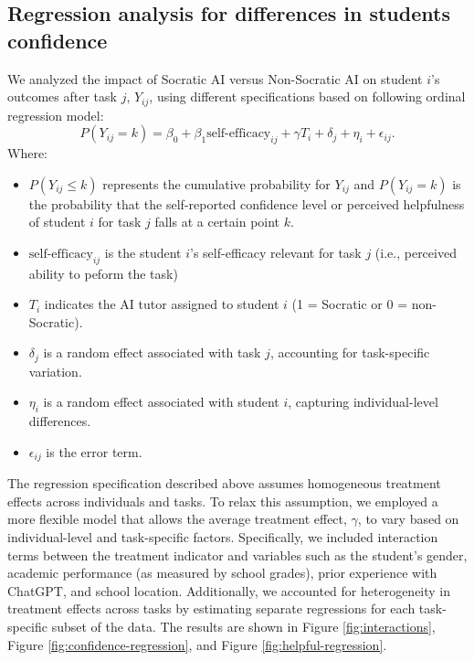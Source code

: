 \documentclass[
  12pt,
]{article}
\begin{document}
\subsection{Regression analysis for differences in students confidence}\label{sec:regress-confidence}

We analyzed the impact of Socratic AI versus Non-Socratic AI on student \(i\)'s outcomes after task \(j\), \(Y_{ij}\), using different specifications based on following ordinal regression model:
\[
  P(Y_{ij} = k) = 
    \beta_0 + \beta_1 \text{self-efficacy}_{ij} + \gamma T_{i} 
    + \delta_j + \eta_i + \epsilon_{ij}.
\]
Where:

\begin{itemize}
\item
  \(P(Y_{ij} \leq k)\) represents the cumulative probability for \(Y_{ij}\) and \(P(Y_{ij} = k)\) is the probability that the self-reported confidence level or perceived helpfulness of student \(i\) for task \(j\) falls at a certain point \(k\).
\item
  \(\text{self-efficacy}_{ij}\) is the student \(i\)'s self-efficacy relevant for task \(j\) (i.e., perceived ability to peform the task)
\item
  \(T_i\) indicates the AI tutor assigned to student \(i\) (1 = Socratic or 0 = non-Socratic).
\item
  \(\delta_j\) is a random effect associated with task \(j\), accounting for task-specific variation.
\item
  \(\eta_i\) is a random effect associated with student \(i\), capturing individual-level differences.
\item
  \(\epsilon_{ij}\) is the error term.
\end{itemize}

The regression specification described above assumes homogeneous treatment effects across individuals and tasks. To relax this assumption, we employed a more flexible model that allows the average treatment effect, \(\gamma\), to vary based on individual-level and task-specific factors. Specifically, we included interaction terms between the treatment indicator and variables such as the student's gender, academic performance (as measured by school grades), prior experience with ChatGPT, and school location. Additionally, we accounted for heterogeneity in treatment effects across tasks by estimating separate regressions for each task-specific subset of the data. The results are shown in Figure \ref{fig:interactions}, Figure \ref{fig:confidence-regression}, and Figure \ref{fig:helpful-regression}.
\end{document}
